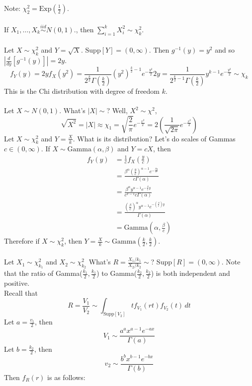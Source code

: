 \documentclass[12pt]{article}
\newcommand{\iid}{\stackrel{iid}{\sim}}
\newcommand{\supp}[1]{\text{Supp}[ #1 ]}
\newcommand{\ginvy}{g^{-1}(y)}
\begin{document}
Note: $\chi_2^2 = \text{Exp}(\frac{1}{2})$. \\~\\
If $X_1, \dots, X_k \iid N(0,1)$., then $\sum_{i = 1}^k X_i^2 \sim \chi^2_k$. \\~\\
Let $X \sim \chi^2_k$ and $Y = \sqrt{X}$. $\supp{Y} = (0, \infty)$. Then $\ginvy = y^2$ and so $| \frac{d}{dy} [\ginvy]| = 2y$. $$f_Y(y) = 2yf_X(y^2)= \frac{1}{2^{\frac{k}{2}} \Gamma(\frac{k}{2})} (y^2)^{\frac{k}{2} - 1} e^{-\frac{y^2}{2}} 2y = \frac{1}{2^{\frac{k}{2} - 1} \Gamma(\frac{k}{2})} y^{k - 1}e^{-\frac{y^2}{2}} \sim \chi_k$$ 
This is the Chi distribution with degree of freedom $k$. \\~\\
Let $X \sim N(0,1)$. What's $|X| \sim$? Well, $X^2 \sim \chi^2$, $$\sqrt{X^2} = |X| \approx \chi_1 = \sqrt{\frac{2}{\pi}} e^{-\frac{x^2}{2}} = 2(\frac{1}{\sqrt{2\pi}} e^{-\frac{x^2}{2}})$$
Let $X \sim \chi_k^2$ and $Y = \frac{X}{k}$. What is its distribution? Let's do scales of Gammas $c \in (0, \infty)$. If $X \sim \text{Gamma}(\alpha, \beta)$ and $Y = cX$, then $$ \begin{aligned} f_Y(y) &= \frac{1}{c}f_X(\frac{y}{c}) \\ &= \frac{\beta^\alpha (\frac{y}{c})^{\alpha - 1} e^{-\frac{\beta y}{c}}}{c\Gamma(\alpha)} \\ &= \frac{\beta^\alpha y^{\alpha - 1} e^{-\frac{\beta}{c}y}}{c^{x - 1}c \Gamma(\alpha)} \\ &= \frac{(\frac{\beta}{c})^{\alpha} y^{\alpha - 1} e^{-(\frac{\beta}{c})y}}{\Gamma(\alpha)} \\ &= \text{Gamma}(\alpha, \frac{\beta}{c}) \end{aligned}$$ 
Therefore if $X \sim \chi_k^2$, then $Y = \frac{X}{k} \sim \text{Gamma}(\frac{k}{2}, \frac{k}{2})$. \\~\\
Let $X_1 \sim \chi^2_{k_1}$ and $X_2 \sim \chi^2_{k_2}$ What's $R = \frac{X_1/k_1}{X_2/k_2} \sim $? $\supp{R} = (0, \infty)$. Note that the ratio of Gamma($\frac{k_1}{2}, \frac{k_1}{2}$) to Gamma($\frac{k_2}{2}, \frac{k_2}{2}$) is both independent and positive. \\
Recall that $$R = \frac{V_1}{V_2} \sim \int_{\supp{V_2}} tf_{V_1}(rt)f_{V_2}(t) \, dt$$  Let $a = \frac{v_1}{2}$, then $$V_1 \sim \frac{a^a x^{a-1}e^{-ax}}{\Gamma(a)}$$ Let $b = \frac{k_2}{2}$, then $$v_2 \sim \frac{b^bx^{b-1}e^{-bx}}{\Gamma(b)}$$
Then $f_R(r)$ is as follows: 
\end{document}
